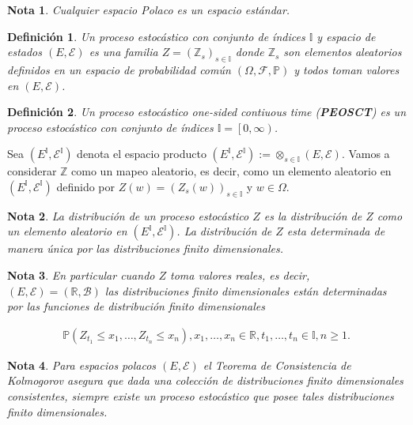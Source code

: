 \documentclass{article}
\newtheorem{Def}{Definición}
\newtheorem{Note}{Nota}
\newcommand{\prob}{\mathbb{P}}
\begin{document}
\begin{Note}
Cualquier espacio Polaco es un espacio est\'andar.
\end{Note}


\begin{Def}
Un proceso estoc\'astico con conjunto de \'indices $\mathbb{I}$ y espacio de estados $\left(E,\mathcal{E}\right)$ es una familia $Z=\left(\mathbb{Z}_{s}\right)_{s\in\mathbb{I}}$ donde $\mathbb{Z}_{s}$ son elementos aleatorios definidos en un espacio de probabilidad com\'un $\left(\Omega,\mathcal{F},\prob\right)$ y todos toman valores en $\left(E,\mathcal{E}\right)$.
\end{Def}

\begin{Def}
Un proceso estoc\'astico \textit{one-sided contiuous time} (\textbf{PEOSCT}) es un proceso estoc\'astico con conjunto de \'indices $\mathbb{I}=\left[0,\infty\right)$.
\end{Def}


Sea $\left(E^{\mathbb{I}},\mathcal{E}^{\mathbb{I}}\right)$ denota el espacio producto $\left(E^{\mathbb{I}},\mathcal{E}^{\mathbb{I}}\right):=\otimes_{s\in\mathbb{I}}\left(E,\mathcal{E}\right)$. Vamos a considerar $\mathbb{Z}$ como un mapeo aleatorio, es decir, como un elemento aleatorio en $\left(E^{\mathbb{I}},\mathcal{E}^{\mathbb{I}}\right)$ definido por $Z\left(w\right)=\left(Z_{s}\left(w\right)\right)_{s\in\mathbb{I}}$ y $w\in\Omega$.

\begin{Note}
La distribuci\'on de un proceso estoc\'astico $Z$ es la distribuci\'on de $Z$ como un elemento aleatorio en $\left(E^{\mathbb{I}},\mathcal{E}^{\mathbb{I}}\right)$. La distribuci\'on de $Z$ esta determinada de manera \'unica por las distribuciones finito dimensionales.
\end{Note}

\begin{Note}
En particular cuando $Z$ toma valores reales, es decir, $\left(E,\mathcal{E}\right)=\left(\mathbb{R},\mathcal{B}\right)$ las distribuciones finito dimensionales est\'an determinadas por las funciones de distribuci\'on finito dimensionales

\begin{eqnarray}
\prob\left(Z_{t_{1}}\leq x_{1},\ldots,Z_{t_{n}}\leq x_{n}\right),x_{1},\ldots,x_{n}\in\mathbb{R},t_{1},\ldots,t_{n}\in\mathbb{I},n\geq1.
\end{eqnarray}
\end{Note}

\begin{Note}
Para espacios polacos $\left(E,\mathcal{E}\right)$ el Teorema de Consistencia de Kolmogorov asegura que dada una colecci\'on de distribuciones finito dimensionales consistentes, siempre existe un proceso estoc\'astico que posee tales distribuciones finito dimensionales.
\end{Note}
\end{document}
